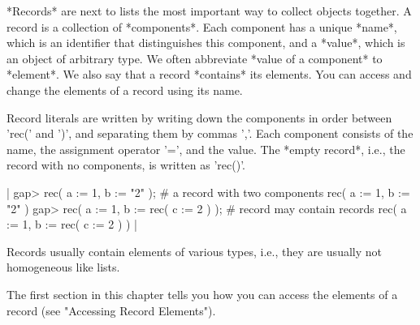 %

*Records* are  next to lists  the most important  way to  collect objects
together.  A record is a collection of  *components*.  Each component has
a unique *name*,    which  is  an  identifier  that   distinguishes  this
component, and a *value*, which is an object of arbitrary type.  We often
abbreviate *value   of a component* to   *element*.  We also  say  that a
record *contains* its  elements.  You can  access and change the elements
of a record using its name.

Record  literals are  written by  writing down  the  components in  order
between  'rec('  and  ')',  and  separating  them  by  commas  ','.  Each
component consists of the  name, the assignment  operator  '\:=', and the
value.   The  *empty  record*, i.e.,  the record  with no  components, is
written as 'rec()'.

|    gap> rec( a := 1, b := "2" );    # a record with two components
    rec(
      a := 1,
      b := "2" )
    gap> rec( a := 1, b := rec( c := 2 ) );    # record may contain records
    rec(
      a := 1,
      b := rec(
          c := 2 ) ) |

Records usually contain elements of various types, i.e., they are usually
not homogeneous like lists.

The  first  section in this chapter   tells  you how  you  can access the
elements of a record (see "Accessing Record Elements").

